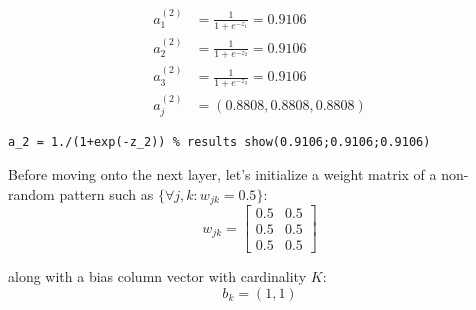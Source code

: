 \documentclass{article}
\begin{document}
\begin{align*}
    a_1^{(2)} &= \frac{1}{1+e^{-z_1}} = 0.9106\\
    a_2^{(2)} &= \frac{1}{1+e^{-z_2}} = 0.9106\\
    a_3^{(2)} &= \frac{1}{1+e^{-z_3}} = 0.9106\\
    a_j^{(2)} &= (0.8808,0.8808,0.8808)
\end{align*}

\begin{lstlisting}[style=matlab, label=your-label]
a_2 = 1./(1+exp(-z_2)) % results show(0.9106;0.9106;0.9106)
\end{lstlisting}

Before moving onto the next layer, let's initialize a weight matrix of a non-random pattern such as $\{\forall j,k : w_{jk} =  0.5 \}$:
\begin{equation*}
    w_{jk} =
            \begin{bmatrix}
            0.5 & 0.5 \\
            0.5 & 0.5 \\
            0.5 & 0.5 
            \end{bmatrix}
\end{equation*}

along with a bias column vector with cardinality $K$:
\begin{equation*}
    b_k = (1,1)
\end{equation*}
\end{document}
